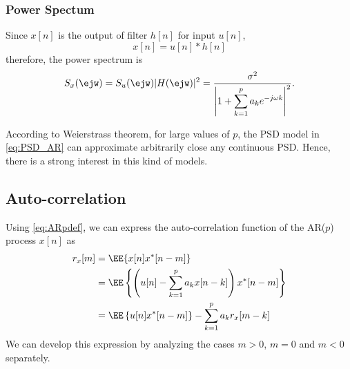 \subsubsection{Power Spectum}

Since $x[n]$ is the output of filter $h[n]$ for input $u[n]$, 
\begin{equation}
\label{eq:signal_model_AR2}
x[n] = u[n] \ast h[n]
\end{equation}
therefore, the power spectrum is 
\begin{equation}
\label{eq:PSD_AR}
S_x(\ejw) = S_u(\ejw) |H(\ejw)|^2 
   	      = \frac{\sigma^2}
	             {\left|\displaystyle 1 + \sum_{k=1}^{p} a_k e^{-j \omega k}
	              \right|^2}.
\end{equation}

According to Weierstrass theorem, for large values of $p$, the PSD model in \eqref{eq:PSD_AR} can approximate arbitrarily close any continuous PSD. Hence, there is a strong interest in this kind of models. 

\subsection{Auto-correlation}

Using \eqref{eq:ARpdef}, we can express the auto-correlation function of the AR($p$) process $x[n]$ as
\begin{align}
\label{eq:rxneg}
r_x[m] 
 	&= \EE\{x[n] x^{\ast}[n-m]\}   \\
	&= \EE\left\{ \left(u[n] - \sum_{k=1}^{p} a_k x[n-k] \right) x^{\ast}[n-m] 
	      \right\}   
	   \nonumber \\
	&= \EE\left\{ u[n] x^{\ast}[n-m] \right\} 
	 - \sum_{k=1}^p a_k r_x[m-k] 
\end{align}
We can develop this expression by analyzing the cases $m>0$, $m=0$ and $m<0$ separately. 

